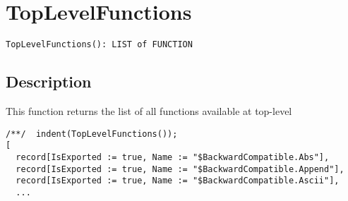 \documentclass[a4paper]{mybook}
\newenvironment{command}{}{} %
\begin{document}
\section{TopLevelFunctions}
\label{TopLevelFunctions}
\begin{command} %


\begin{Verbatim}[label=syntax, rulecolor=\color{MidnightBlue},
frame=single]
TopLevelFunctions(): LIST of FUNCTION
\end{Verbatim}


\subsection*{Description}

This function returns the list of all functions available at top-level
\begin{Verbatim}[label=example, rulecolor=\color{PineGreen}, frame=single]
/**/  indent(TopLevelFunctions());
[
  record[IsExported := true, Name := "$BackwardCompatible.Abs"],
  record[IsExported := true, Name := "$BackwardCompatible.Append"],
  record[IsExported := true, Name := "$BackwardCompatible.Ascii"],
  ...
\end{Verbatim}


\end{command} %
\end{document}
